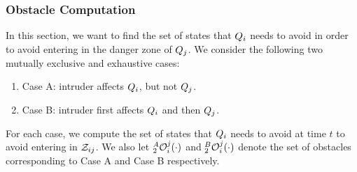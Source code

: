 \subsubsection{Obstacle Computation} \label{sec:intruderObs_case2}
In this section, we want to find the set of states that $Q_i$ needs to avoid in order to avoid entering in the danger zone of $Q_j$. We consider the following two mutually exclusive and exhaustive cases:
\begin{enumerate}
\item Case A: intruder affects $Q_i$, but not $Q_j$.
\item Case B: intruder first affects $Q_i$ and then $Q_j$.
\end{enumerate}
For each case, we compute the set of states that $Q_i$ needs to avoid at time $t$ to avoid entering in $\mathcal{Z}_{ij}$. We also let $_2^A\mathcal{O}_i^j(\cdot)$ and $_2^B\mathcal{O}_i^j(\cdot)$ denote the set of obstacles corresponding to Case A and Case B respectively. 
